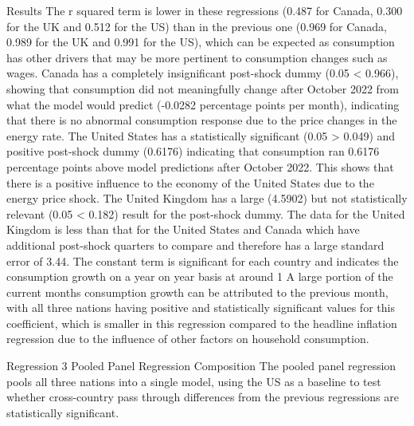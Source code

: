 Results
The r squared term is lower in these regressions (0.487 for Canada, 0.300 for the UK and 0.512 for the US) than in the previous one (0.969 for Canada, 0.989 for the UK and 0.991 for the US), which can be expected as consumption has other drivers that may be more pertinent to consumption changes such as wages.
Canada has a completely insignificant post-shock dummy (0.05 < 0.966), showing that consumption did not meaningfully change after October 2022 from what the model would predict (-0.0282 percentage points per month), indicating that there is no abnormal consumption response due to the price changes in the energy rate.
The United States has a statistically significant (0.05 > 0.049) and positive post-shock dummy (0.6176) indicating that consumption ran 0.6176 percentage points above model predictions after October 2022. This shows that there is a positive influence to the economy of the United States due to the energy price shock.
The United Kingdom has a large (4.5902) but not statistically relevant (0.05 < 0.182) result for the post-shock dummy. The data for the United Kingdom is less than that for the United States and Canada which have additional post-shock quarters to compare and therefore has a large standard error of 3.44.
The constant term is significant for each country and indicates the consumption growth on a year on year basis at around 1%
A large portion of the current months consumption growth can be attributed to the previous month, with all three nations having positive and statistically significant values for this coefficient, which is smaller in this regression compared to the headline inflation regression due to the influence of other factors on household consumption.


Regression 3 Pooled Panel
Regression Composition
The pooled panel regression pools all three nations into a single model, using the US as a baseline to test whether cross-country pass through differences from the previous regressions are statistically significant.

